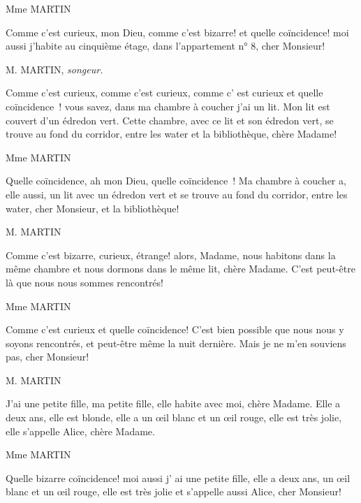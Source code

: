 \documentclass{article}
\begin{document}
			\begin{center}
				Mme MARTIN
			\end{center}
			Comme c'est curieux, mon Dieu, comme c'est
			bizarre! et quelle coïncidence! moi aussi j'habite au
			cinquième étage, dans l'appartement n° 8, cher Monsieur!
			
			\begin{center}
				M. MARTIN, \textit{songeur.}
			\end{center}
			Comme c'est curieux, comme c'est curieux, comme
			c' est curieux et quelle coïncidence~! vous savez, dans
			ma chambre à coucher j'ai un lit. Mon lit est couvert
			d'un édredon vert. Cette chambre, avec ce lit et son
			édredon vert, se trouve au fond du corridor, entre
			les water et la bibliothèque, chère Madame!
			
			\begin{center}
				Mme MARTIN
			\end{center}
			Quelle coïncidence, ah mon Dieu, quelle coïncidence~! Ma chambre à coucher a, elle aussi, un lit avec un édredon vert et se trouve au fond du corridor, entre les water, cher Monsieur, et la bibliothèque!
			
			\begin{center}
				M. MARTIN
			\end{center}
			Comme c'est bizarre, curieux, étrange! alors,
			Madame, nous habitons dans la même chambre et
			nous dormons dans le même lit, chère Madame.
			C'est peut-être là que nous nous sommes rencontrés!
			
			\begin{center}
				Mme MARTIN
			\end{center}
			Comme c'est curieux et quelle coïncidence! C'est bien possible que nous nous y soyons rencontrés, et peut-être même la nuit dernière. Mais je ne m'en souviens pas, cher Monsieur!
			
			\begin{center}
				M. MARTIN
			\end{center}
			J'ai une petite fille, ma petite fille, elle habite avec
			moi, chère Madame. Elle a deux ans, elle est blonde,
			elle a un œil blanc et un œil rouge, elle est très jolie, elle s'appelle Alice, chère Madame.
	
			\begin{center}
				Mme MARTIN
			\end{center}
			Quelle bizarre coïncidence! moi aussi j' ai une petite
			fille, elle a deux ans, un œil blanc et un œil rouge, elle
			est très jolie et s'appelle aussi Alice, cher Monsieur!
			
\end{document}
